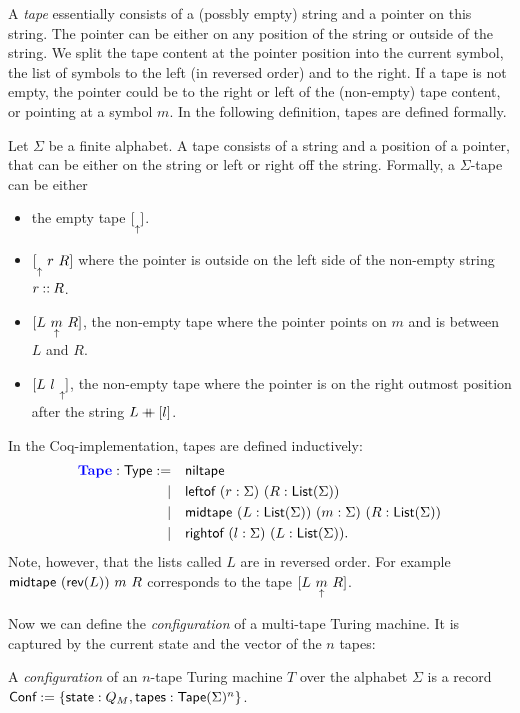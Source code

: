 \documentclass{psartcl}
\begin{document}
A \emph{tape} essentially consists of a (possbly empty) string and a pointer on this string.  The pointer can be either on any position of the string
or outside of the string.  We split the tape content at the pointer position into the current symbol, the list of symbols to the left (in reversed
order) and to the right.  If a tape is not empty, the pointer could be to the right or left of the (non-empty) tape content, or pointing at a symbol
$m$.  In the following definition, tapes are defined formally.

\begin{definition}[Tape]
  \label{def:tape}
  Let $\Sigma$ be a finite alphabet.  A tape consists of a string and a position of a pointer, that can be either on the string or left or right off
  the string.  Formally, a $\Sigma$-tape can be either
  \begin{itemize}
    \item the empty tape $[ \underset{\uparrow}{} ]$.
    \item $[ \underset{\uparrow}{}~r~R ]$ where the pointer is outside on the left side of the non-empty string $r \mathbin{::} R$.
    \item $[ L~\underset{\uparrow}{m}~R ]$, the non-empty tape where the pointer points on $m$ and is between $L$ and $R$.
    \item $[ L~l~\underset{\uparrow}{} ]$, the non-empty tape where the pointer is on the right outmost position after the string $L \mathbin{+\mkern-10mu+} [l]$.
  \end{itemize}


  In the Coq-implementation, tapes are defined inductively:
  \begin{alignat*}{2}
    {\color{blue}\textbf{Tape}}:\textsf{Type} := \quad & \textsf{niltape} \\
                       | \quad & \textsf{leftof}  ~ (r:\Sigma) ~ (R:\textsf{List}(\Sigma)) \\
                       | \quad & \textsf{midtape} ~ (L:\textsf{List}(\Sigma)) ~ (m:\Sigma) ~ (R:\textsf{List}(\Sigma)) \\
                       | \quad & \textsf{rightof} ~ (l:\Sigma) ~ (L:\textsf{List}(\Sigma)).
  \end{alignat*}
  Note, however, that the lists called $L$ are in reversed order.  For example $\textsf{midtape}~(\textsf{rev}(L))~m~R$ corresponds to the tape
  $[ L~\underset{\uparrow}{m}~R ]$.
\end{definition}

Now we can define the \emph{configuration} of a multi-tape Turing machine.  It is captured by the current state and the vector of the $n$ tapes:
\begin{definition}[Configuration]
  \label{def:config}
  A \emph{configuration} of an $n$-tape Turing machine $T$ over the alphabet $\Sigma$ is a record $\textsf{Conf} := \{\textsf{state}:Q_M, \textsf{tapes}:\textsf{Tape}(\Sigma)^n\}$.
\end{definition}
\end{document}

